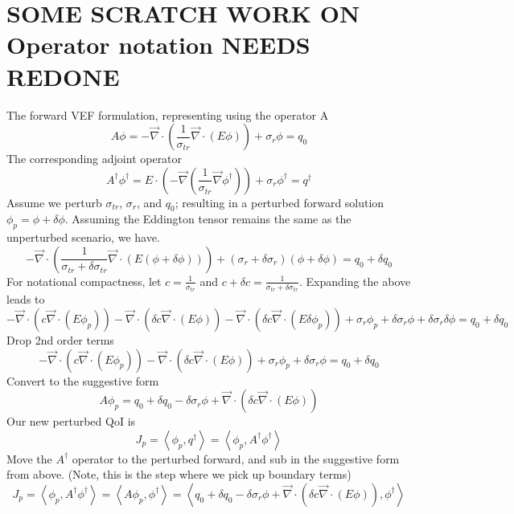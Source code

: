 \documentclass{article}
\newcommand{\bra}{\left\langle}
\newcommand{\ket}{\right\rangle}
\newcommand{\vdiv}{\vec{\nabla} \cdot}
\newcommand{\vgrad}{\vec{\nabla}}
\begin{document}
\section{SOME SCRATCH WORK ON Operator notation NEEDS REDONE}
The forward VEF formulation, representing using the operator A
\[
A \phi = -\vdiv \left( \frac{1}{\sigma_{tr}} \vdiv \left( E \phi \right) \right)
+ \sigma_r \phi
= q_0 
\]
The corresponding adjoint operator
\[
A^\dag \phi^\dag = E \cdot \left( - \vgrad \left( \frac{1}{\sigma_{tr}} \vgrad \phi^\dag \right) \right)
+ \sigma_r \phi^\dag
= q^\dag
\]
Assume we perturb $\sigma_{tr}$, $\sigma_r$, and $q_0$; resulting in a perturbed forward solution $\phi_p = \phi + \delta \phi$. Assuming the Eddington tensor remains the same as the unperturbed scenario, we have.
\[
-\vdiv \left( \frac{1}{\sigma_{tr}+\delta \sigma_{tr}} \vdiv \left( E \left( \phi + \delta \phi \right) \right) \right)
+ \left( \sigma_r + \delta \sigma_r \right) \left( \phi + \delta \phi \right)
= q_0 + \delta q_0
\]
For notational compactness, let $c=\frac{1}{\sigma_{tr}}$ and $c + \delta c = \frac{1}{\sigma_{tr}+\delta \sigma_{tr}}$. Expanding the above leads to 
\[ 
-\vdiv \left( c \vdiv \left( E \phi_p \right) \right) 
- \vdiv \left( \delta c \vdiv \left( E \phi \right) \right) 
- \vdiv \left( \delta c \vdiv \left( E \delta \phi_p \right) \right) 
+ \sigma_r \phi_p
+ \delta \sigma_r \phi
+ \delta \sigma_r \delta \phi
= q_0 + \delta q_0 
\]
Drop 2nd order terms
\[ 
-\vdiv \left( c \vdiv \left( E \phi_p \right) \right) 
- \vdiv \left( \delta c \vdiv \left( E \phi \right) \right) 
+ \sigma_r \phi_p
+ \delta \sigma_r \phi
= q_0 + \delta q_0 
\]
Convert to the suggestive form
\[ 
A \phi_p
= q_0 + \delta q_0 - \delta \sigma_r \phi + \vdiv \left( \delta c \vdiv \left( E \phi \right) \right) 
\]
Our new perturbed QoI is
\[
J_p = \bra \phi_p , q^\dag \ket = \bra \phi_p , A^\dag \phi^\dag\ket
\]
Move the $A^\dag$ operator to the perturbed forward, and sub in the suggestive form from above. (Note, this is the step where we pick up boundary terms)
\[
J_p = \bra \phi_p , A^\dag \phi^\dag\ket =  \bra A \phi_p , \phi^\dag\ket = \bra q_0 + \delta q_0 - \delta \sigma_r \phi + \vdiv \left( \delta c \vdiv \left( E \phi \right) \right), \phi^\dag \ket
\]
\end{document}
